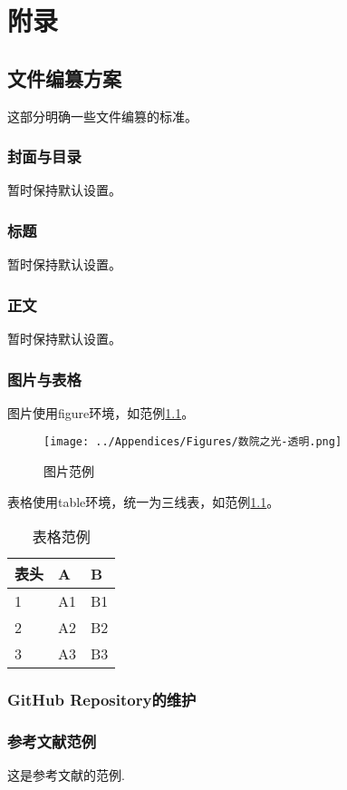 \documentclass{book}
\begin{document}
\chapter{附录}

\section{文件编篡方案}

这部分明确一些文件编篡的标准。

\subsection{封面与目录}

暂时保持默认设置。

\subsection{标题}

暂时保持默认设置。

\subsection{正文}

暂时保持默认设置。

\subsection{图片与表格}

图片使用figure环境，如范例\ref{fig:template-0}。
\begin{figure}[htbp]
    \centering
    \texttt{[image: ../Appendices/Figures/数院之光-透明.png]}
    \caption{图片范例}
    \label{fig:template-0}
\end{figure}

表格使用table环境，统一为三线表，如范例\ref{tab:template-0}。

\begin{table}[htbp]
    \centering
    \caption{表格范例}
    \begin{tabular}{ p{2cm} | p{4.5cm} | p{4.5cm} }
        表头 & A & B \\ \hline
        1 & A1 & B1 \\ 
        2 & A2 & B2 \\
        3 & A3 & B3
    \end{tabular}
    \label{tab:template-0}
\end{table}


\subsection{GitHub Repository的维护}



\subsection{参考文献范例}
这是参考文献的范例\cite{Einstein_Podolsky_Rosen_1935}. 




\end{document}
